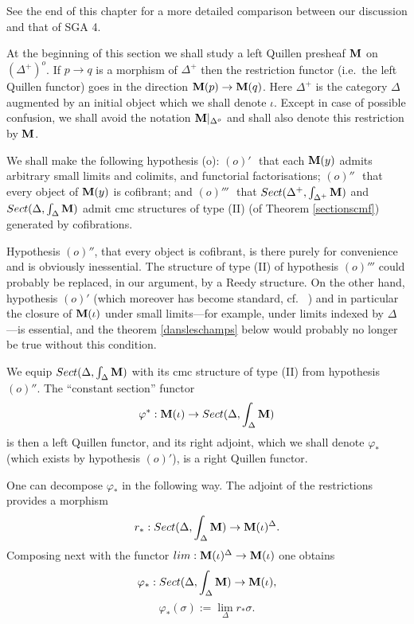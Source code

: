 See the end of this chapter for a more detailed comparison between our
discussion and that of SGA 4.

At the beginning of this section we shall study a left Quillen presheaf
${\bf M}$ on $(\Delta ^+)^o$. If $p\rightarrow q$ is a morphism of $\Delta^+$
then the restriction functor (i.e.\ the left Quillen functor) goes in the
direction ${\bf M} (p)\rightarrow {\bf M} (q)$. Here $\Delta ^+$ is the category
$\Delta$ augmented by an initial object which we shall denote $\iota$.
Except in case of possible confusion, we shall avoid the notation
${\bf M} |_{\Delta ^o}$ and shall also denote this restriction by ${\bf M}$.

We shall make the following hypothesis (o):
\newline
$(o)'$\,\, that each ${\bf M} (y)$ admits arbitrary small limits and colimits,
and functorial factorisations;
\newline
$(o)''$\,\,
that every object of ${\bf M} (y)$ is cofibrant; and
\newline
$(o)'''$\,\, that $Sect (\Delta ^+, \int
_{\Delta ^+}{\bf M} )$ and $Sect (\Delta , \int _{\Delta} {\bf M} )$ admit
cmc structures of type (II)
(of Theorem \ref{sectionscmf}) generated by
cofibrations.

Hypothesis $(o)''$, that every object is cofibrant, is there purely for
convenience and is obviously inessential. The structure of type (II) of
hypothesis $(o)'''$ could probably be replaced, in our argument, by a Reedy
structure. On the other hand, hypothesis $(o)'$ (which moreover has become
standard, cf.\ \cite{Hirschhorn} \cite{DHK} \cite{HoveyBook}) and in
particular the closure of ${\bf M} (\iota )$ under small limits---for example,
under limits indexed by $\Delta$---is essential, and the theorem
\ref{dansleschamps} below would probably no longer be true without this
condition.

We equip $Sect (\Delta , \int _{\Delta} {\bf M} )$ with its
cmc structure of type (II) from hypothesis $(o)''$.
The ``constant section'' functor
$$
\varphi ^{\ast} : {\bf M} (\iota )\rightarrow Sect (\Delta , \int _{\Delta} {\bf M} )
$$
is then a left Quillen functor, and its right adjoint, which we shall denote
$\varphi _{\ast}$ (which exists by hypothesis $(o)'$), is a right Quillen
functor.

One can decompose $\varphi _{\ast}$ in the following way. The adjoint of the
restrictions provides a morphism
$$
r_{\ast}:Sect (\Delta , \int _{\Delta} {\bf M} )\rightarrow {\bf M} (\iota )^{\Delta}.
$$
Composing
next with the functor $lim : {\bf M} (\iota )^{\Delta} \rightarrow {\bf M} (\iota
)$ one obtains
$$
\varphi _{\ast} : Sect (\Delta , \int _{\Delta} {\bf M} )\rightarrow {\bf M} (\iota ),
$$
$$
\varphi _{\ast} (\sigma ) := \lim _{\Delta} r_{\ast}\sigma .
$$

